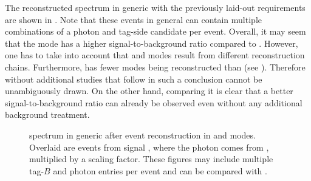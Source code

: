 The reconstructed \BtoXsgamma spectrum in generic \MC with the previously laid-out requirements are shown in .
Note that these events in general can contain multiple combinations of a photon and tag-side candidate per event.
Overall, it may seem that the \feiBz mode has a higher signal-to-background ratio compared to \feiBp.
However, one has to take into account that \feiBp and \feiBz modes result
from different reconstruction chains.
Furthermore, \feiBz has fewer modes being reconstructed than \feiBp (see ).
Therefore without additional studies that follow in  such a conclusion cannot be unambiguously drawn. 
On the other hand, comparing  it is clear that a better signal-to-background ratio can already be observed even without any additional background treatment.

\begin{figure}[htbp!]
    \centering
    \caption{\label{fig:spectrum_after_reco} \BtoXsgamma spectrum in generic \MC after event reconstruction in \feiBp and \feiBz modes.
    Overlaid are events from signal \MC, where the photon comes from \BtoXsgamma, multiplied by a scaling factor.
    These figures may include multiple tag-$B$ and photon entries per event and can be compared with .
    }
\end{figure}

